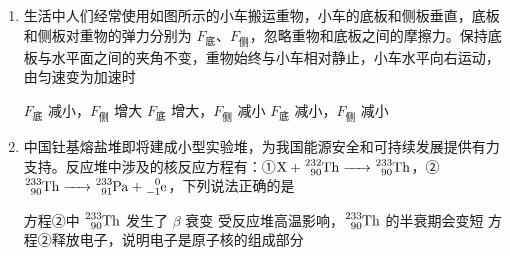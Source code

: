 \documentclass[\gkver]{gaokaozhenti}
\begin{document}
\begin{enumerate}
\item
生活中人们经常使用如图所示的小车搬运重物，小车的底板和侧板垂直，底板和侧板对重物的弹力分别为 $F_{\text{底}}$、$F_{\text{侧}}$，忽略重物和底板之间的摩擦力。保持底板与水平面之间的夹角不变，重物始终与小车相对静止，小车水平向右运动，由匀速变为加速时


{$F_{\text{底}}$ 减小，$F_{\text{侧}}$ 增大}
{$F_{\text{底}}$ 增大，$F_{\text{侧}}$ 减小}
{$F_{\text{底}}$ 减小，$F_{\text{侧}}$ 减小}


\item
中国钍基熔盐堆即将建成小型实验堆，为我国能源安全和可持续发展提供有力支持。反应堆中涉及的核反应方程有：①$\ce{X + ^{232}_{90}Th -> ^{233}_{90}Th}$，②$\ce{^{233}_{90}Th -> ^{233}_{91}Pa + ^{0}_{-1}e}$，下列说法正确的是

{方程②中 $\ce{^{233}_{90}Th}$ 发生了 $\beta$ 衰变}
{受反应堆高温影响，$\ce{^{233}_{90}Th}$ 的半衰期会变短}
{方程②释放电子，说明电子是原子核的组成部分}

\end{enumerate}
\end{document}
